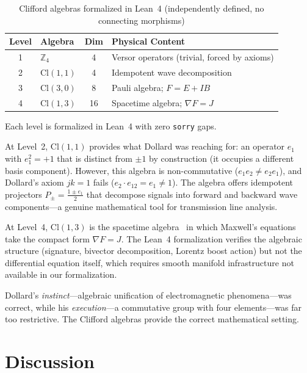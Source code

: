 \documentclass[runningheads]{llncs}
\begin{document}
\begin{table}[ht]
\centering
\caption{Clifford algebras formalized in Lean~4 (independently defined, no connecting morphisms)}
\label{tab:hierarchy}
\begin{tabular}{@{}clcl@{}}
\toprule
\textbf{Level} & \textbf{Algebra} & \textbf{Dim} & \textbf{Physical Content} \\
\midrule
1 & $\mathbb{Z}_4$ & 4 & Versor operators (trivial, forced by axioms) \\
2 & $\mathrm{Cl}(1,1)$ & 4 & Idempotent wave decomposition \\
3 & $\mathrm{Cl}(3,0)$ & 8 & Pauli algebra; $F = E + IB$ \\
4 & $\mathrm{Cl}(1,3)$ & 16 & Spacetime algebra; $\nabla F = J$ \\
\bottomrule
\end{tabular}
\end{table}

Each level is formalized in Lean~4 with zero \texttt{sorry} gaps.

At Level~2, $\mathrm{Cl}(1,1)$ provides what Dollard was reaching for: an
operator $e_1$ with $e_1^2 = +1$ that is distinct from $\pm 1$ by construction
(it occupies a different basis component). However,
this algebra is non-commutative ($e_1 e_2 \neq e_2 e_1$), and Dollard's axiom
$jk = 1$ fails ($e_2 \cdot e_{12} = e_1 \neq 1$). The algebra offers idempotent
projectors $P_{\pm} = \frac{1 \pm e_1}{2}$ that decompose signals into
forward and backward wave components---a genuine mathematical tool for
transmission line analysis.

At Level~4, $\mathrm{Cl}(1,3)$ is the spacetime algebra~\cite{hestenes1966,doran2003}
in which Maxwell's equations take the compact form $\nabla F = J$. The Lean~4
formalization verifies the algebraic structure (signature, bivector decomposition,
Lorentz boost action) but not the differential equation itself, which requires
smooth manifold infrastructure not available in our formalization.

Dollard's \emph{instinct}---algebraic unification of electromagnetic
phenomena---was correct, while his \emph{execution}---a commutative group
with four elements---was far too restrictive. The Clifford algebras provide
the correct mathematical setting.

\section{Discussion}
\label{sec:discussion}
\end{document}
